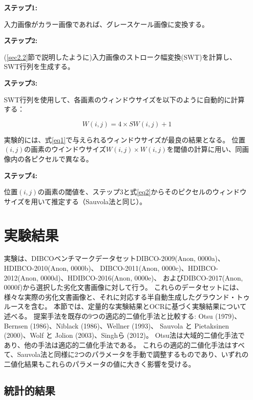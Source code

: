 \documentclass[uplatex, twocolumn,10pt]{jsarticle}
\begin{document}
\textbf{ステップ1:} \par
\noindent 入力画像がカラー画像であれば、グレースケール画像に変換する。

\textbf{ステップ2:} \par
\noindent (\ref{sec2.2}節で説明したように)入力画像のストローク幅変換(SWT)を計算し、SWT行列を生成する。

\textbf{ステップ3:} \par
\noindent SWT行列を使用して、各画素のウィンドウサイズを以下のように自動的に計算する：

\begin{equation}\label{eq2}
    W(i, j) = 4 \times SW(i, j) + 1
\end{equation}

実験的には、式\ref{eq1}で与えられるウィンドウサイズが最良の結果となる。
位置$(i, j)$の画素のウインドウサイズ$W(i, j) \times W(i, j)$を閾値の計算に用い、同画像内の各ピクセルで異なる。

\textbf{ステップ4:} \par
\noindent 位置$(i, j)$の画素の閾値を、ステップ3と式\ref{eq2}からそのピクセルのウィンドウサイズを用いて推定する（Sauvola法と同じ）。



\section{実験結果}

実験は、DIBCOベンチマークデータセットDIBCO-2009(Anon, 0000a)\cite{bib26}、HDIBCO-2010(Anon, 0000b)\cite{bib27}、
DIBCO-2011(Anon, 0000c)\cite{bib28}、HDIBCO-2012(Anon, 0000d)\cite{bib29}、HDIBCO-2016(Anon, 0000e)\cite{bib30}、
およびDIBCO-2017(Anon, 0000f)\cite{bib31}から選択した劣化文書画像に対して行う。
これらのデータセットには、様々な実際の劣化文書画像と、それに対応する半自動生成したグラウンド・トゥルースを含む。
本節では、定量的な実験結果とOCRに基づく実験結果について述べる。
提案手法を既存の9つの適応的二値化手法と比較する:
Otsu (1979)、Bernsen (1986)、Niblack (1986)、Wellner (1993)、
Sauvola と Pietaksinen (2000)、Wolf と Jolion (2003)、Singhら (2012)。
Otsu法は大域的二値化手法であり、他の手法は適応的二値化手法である。
これらの適応的二値化手法はすべて、Sauvola法と同様に2つのパラメータを手動で調整するものであり、いずれの二値化結果もこれらのパラメータの値に大きく影響を受ける。

\subsection{統計的結果}
\end{document}
